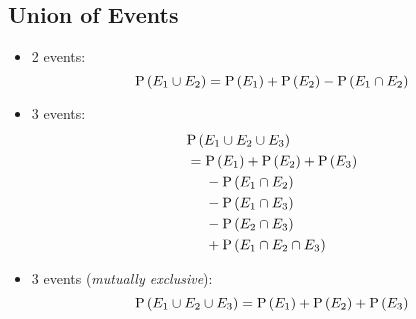 \subsection*{Union of Events}

\begin{itemize}
    \item 2 events:
    \begin{equation*}
        \mathrm{P} \left( E_1 \cup E_2 \right) = \mathrm{P} \left( E_1 \right) + \mathrm{P} \left( E_2 \right) - \mathrm{P} \left( E_1 \cap E_2 \right)
    \end{equation*}
    \item 3 events:
    \begin{align*}
        &\mathrm{P} \left( E_1 \cup E_2 \cup E_3 \right) \\
        &= \begin{aligned}[t]
        &\mathrm{P} \left( E_1 \right) + \mathrm{P} \left( E_2 \right) + \mathrm{P} \left( E_3 \right) \\
        &- \mathrm{P} \left( E_1 \cap E_2 \right) \\
        &- \mathrm{P} \left( E_1 \cap E_3 \right) \\
        &- \mathrm{P} \left( E_2 \cap E_3 \right) \\
        &+ \mathrm{P} \left( E_1 \cap E_2 \cap E_3 \right)
        \end{aligned}
    \end{align*}
    \item 3 events (\textit{mutually exclusive}):
    \begin{equation*}
        \mathrm{P} \left( E_1 \cup E_2 \cup E_3 \right) = \mathrm{P} \left( E_1 \right) + \mathrm{P} \left( E_2 \right) + \mathrm{P} \left( E_3 \right)
    \end{equation*}
\end{itemize}
